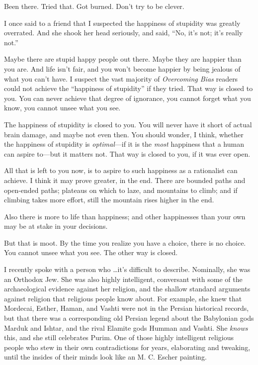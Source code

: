 {
 Been there. Tried that. Got burned. Don't try to
be clever.}

{
 I once said to a friend that I suspected the happiness of
stupidity was greatly overrated. And she shook her head seriously, and
said, ``No, it's not;
it's really not.''}

{
 Maybe there are stupid happy people out there. Maybe they are
happier than you are. And life isn't fair, and you
won't become happier by being jealous of what you
can't have. I suspect the vast majority of
\textit{Overcoming Bias} readers could not achieve the
``happiness of stupidity'' if they
tried. That way is closed to you. You can never achieve that degree of
ignorance, you cannot forget what you know, you cannot unsee what you
see.}

{
 The happiness of stupidity is closed to you. You will never have
it short of actual brain damage, and maybe not even then. You should
wonder, I think, whether the happiness of stupidity is
\textit{optimal}{}---if it is the \textit{most} happiness that a human
can aspire to---but it matters not. That way is closed to you, if it
was ever open.}

{
 All that is left to you now, is to aspire to such happiness as a
rationalist can achieve. I think it may prove greater, in the end.
There are bounded paths and open-ended paths; plateaus on which to
laze, and mountains to climb; and if climbing takes more effort, still
the mountain rises higher in the end.}

{
 Also there is more to life than happiness; and other happinesses
than your own may be at stake in your decisions.}

{
 But that is moot. By the time you realize you have a choice, there
is no choice. You cannot unsee what you see. The other way is closed.}

\myendsectiontext


\bigskip


{
 I recently spoke with a person who \ldots it's
difficult to describe. Nominally, she was an Orthodox Jew. She was also
highly intelligent, conversant with some of the archaeological evidence
against her religion, and the shallow standard arguments against
religion that religious people know about. For example, she knew that
Mordecai, Esther, Haman, and Vashti were not in the Persian historical
records, but that there was a corresponding old Persian legend about
the Babylonian gods Marduk and Ishtar, and the rival Elamite gods
Humman and Vashti. She \textit{knows} this, and she still celebrates
Purim. One of those highly intelligent religious people who stew in
their own contradictions for years, elaborating and tweaking, until the
insides of their minds look like an M. C. Escher painting. }

